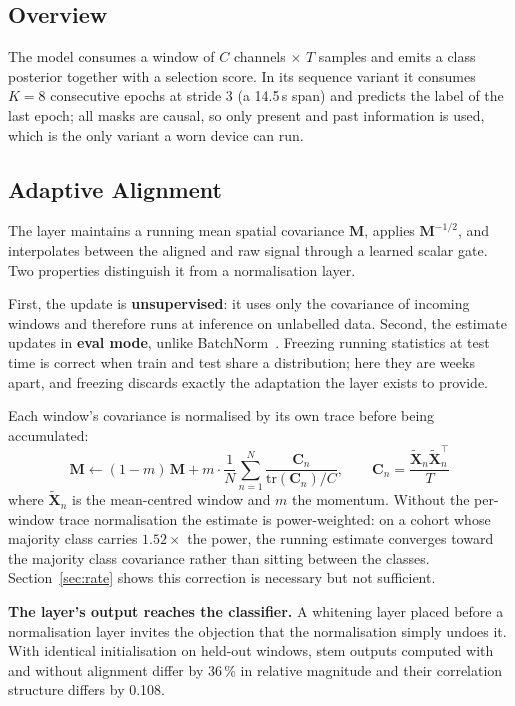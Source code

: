 \documentclass[conference]{IEEEtran}
\begin{document}
\subsection{Overview}

The model consumes a window of $C$ channels $\times$ $T$ samples and emits a
class posterior together with a selection score. In its sequence variant it
consumes $K=8$ consecutive epochs at stride 3 (a 14.5\,s span) and predicts the
label of the last epoch; all masks are causal, so only present and past
information is used, which is the only variant a worn device can run.

\subsection{Adaptive Alignment}

The layer maintains a running mean spatial covariance $\mathbf{M}$, applies
$\mathbf{M}^{-1/2}$, and interpolates between the aligned and raw signal through
a learned scalar gate. Two properties distinguish it from a normalisation layer.

First, the update is \textbf{unsupervised}: it uses only the covariance of
incoming windows and therefore runs at inference on unlabelled data. Second, the
estimate updates in \textbf{eval mode}, unlike BatchNorm~\cite{batchnorm}.
Freezing running statistics at test time is correct when train and test share a
distribution; here they are weeks apart, and freezing discards exactly the
adaptation the layer exists to provide.

Each window's covariance is normalised by its own trace before being accumulated:
\begin{equation}
\mathbf{M} \leftarrow (1-m)\,\mathbf{M} + m \cdot
\frac{1}{N}\sum_{n=1}^{N} \frac{\mathbf{C}_n}{\mathrm{tr}(\mathbf{C}_n)/C},
\qquad
\mathbf{C}_n = \frac{\tilde{\mathbf{X}}_n \tilde{\mathbf{X}}_n^{\top}}{T}
\end{equation}
where $\tilde{\mathbf{X}}_n$ is the mean-centred window and $m$ the momentum.
Without the per-window trace normalisation the estimate is power-weighted: on a
cohort whose majority class carries $1.52\times$ the power, the running estimate
converges toward the majority class covariance rather than sitting between the
classes. Section~\ref{sec:rate} shows this correction is necessary but not
sufficient.

\textbf{The layer's output reaches the classifier.} A whitening layer placed
before a normalisation layer invites the objection that the normalisation simply
undoes it. With identical initialisation on held-out windows, stem outputs
computed with and without alignment differ by 36\,\% in relative magnitude and
their correlation structure differs by 0.108.
\end{document}
